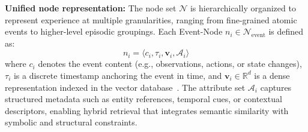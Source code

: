 \documentclass[11pt]{article}
\begin{document}

\noindent \textbf{Unified node representation:}
The node set $\mathcal{N}$ is hierarchically organized to represent experience at multiple granularities, ranging from fine-grained atomic events to higher-level episodic groupings. Each Event-Node $n_i \in \mathcal{N}_{\text{event}}$ is defined as:
\begin{equation}
    n_i = \langle c_i, \tau_i, \mathbf{v}_i, \mathcal{A}_i \rangle
\end{equation}
where $c_i$ denotes the event content (e.g., observations, actions, or state changes), $\tau_i$ is a discrete timestamp anchoring the event in time, and $\mathbf{v}_i \in \mathbb{R}^d$ is a dense representation indexed in the vector database~\citep{johnson2019billion}. The attribute set $\mathcal{A}_i$ captures structured metadata such as entity references, temporal cues, or contextual descriptors, enabling hybrid retrieval that integrates semantic similarity with symbolic and structural constraints.

\end{document}

